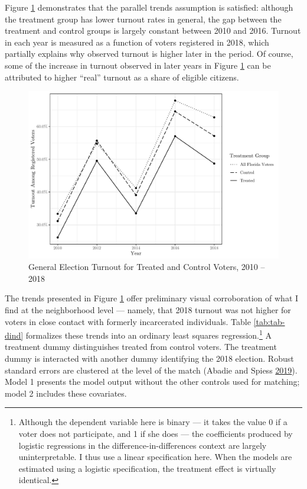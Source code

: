 \documentclass[
  12pt,
]{article}
\begin{document}
Figure \ref{fig:dind} demonstrates that the parallel trends assumption is satisfied: although the treatment group has lower turnout rates in general, the gap between the treatment and control groups is largely constant between 2010 and 2016. Turnout in each year is measured as a function of voters registered in 2018, which partially explains why observed turnout is higher later in the period. Of course, some of the increase in turnout observed in later years in Figure \ref{fig:dind} can be attributed to higher ``real'' turnout as a share of eligible citizens.

\begin{figure}[H]

{\centering \includegraphics{amendment_4_turnout_files/figure-latex/dind-1} 

}

\caption{\label{fig:dind}General Election Turnout for Treated and Control Voters, 2010 -- 2018}\label{fig:dind}
\end{figure}

The trends presented in Figure \ref{fig:dind} offer preliminary visual corroboration of what I find at the neighborhood level --- namely, that 2018 turnout was not higher for voters in close contact with formerly incarcerated individuals. Table \ref{tab:tab-dind} formalizes these trends into an ordinary least squares regression.\footnote{Although the dependent variable here is binary --- it takes the value 0 if a voter does not participate, and 1 if she does --- the coefficients produced by logistic regressions in the difference-in-differences context are largely uninterpretable. I thus use a linear specification here. When the models are estimated using a logistic specification, the treatment effect is virtually identical.} A treatment dummy distinguishes treated from control voters. The treatment dummy is interacted with another dummy identifying the 2018 election. Robust standard errors are clustered at the level of the match (Abadie and Spiess \protect\hyperlink{ref-Abadie2019}{2019}). Model 1 presents the model output without the other controls used for matching; model 2 includes these covariates.
\end{document}
